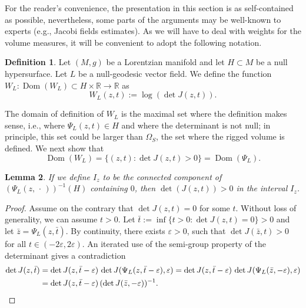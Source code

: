 \documentclass[12pt,a4paper]{amsart}
\theoremstyle{plain}
\newtheorem{lemma}{Lemma}[section]
\theoremstyle{definition}
\newtheorem{definition}[lemma]{Definition}
\numberwithin{equation}{section}
\let\temp\phi
\let\phi\varphi
\let\temp\epsilon
\let\epsilon\varepsilon
\let\varepsilon\temp
\newcommand{\R}{\mathbb{R}}
\DeclareMathOperator{\Dom}{Dom}
\DeclareMathOperator{\dom}{Dom}
\newcommand{\dotargument}{\,\cdot\,}
\newcommand{\gflow}{\Psi}
\begin{document}
For the reader's convenience, the presentation 
in this section is as self-contained as
possible, nevertheless, some parts of the arguments may be well-known
to experts (e.g., Jacobi fields estimates).
As we will have to deal with weights for the volume measures, it will be convenient  
to adopt the following notation. 
%
\begin{definition}
  Let $(M,g)$ be a Lorentzian manifold and let $H\subset M$ be a null hypersurface.
  Let $L$ be a null-geodesic vector field.
  We define the function $W_{L}: \Dom(W_{L}) \subset H\times \R\to \R$ as
%
\begin{equation}\label{E:W}
  W_{L}(z,t):=   \log(\det J(z,t))  .
\end{equation}
%
\end{definition}

The domain of definition of $W_{L}$ is the maximal set where the
definition makes sense, i.e., where $\gflow_{L}(z,t)\in H$ and where the
determinant is not null; in principle, this set could be larger than
$\Omega_S$, the set where the rigged volume is defined. 
%
We  next  show that
$$\dom(W_{L}) = \{ (z,t) \colon \det J(z,t) > 0 \}=\dom(\gflow_{L}).$$

\begin{lemma}\label{L:domainJ}
If we define
  $I_{z}$ to be the connected component of $(\gflow_{L}(z,\dotargument))^{-1} (H)$ containing $0$, then
$\det(J(z,t)) > 0$ in the interval $I_{z}$.
\end{lemma}

\begin{proof}
  Assume on the contrary that $\det J(z,t)=0$ for some $t$. Without
  loss of generality, we can assume $t>0$.
  Let $\bar t:=\inf\{t>0: \det J(z,t)=0\}>0$ and let $\bar
  z=\gflow_L(z,\bar t)$.
  By continuity, there exists $\epsilon>0$, such that $\det J(\bar z,t)>0$
  for all $t\in(-2\epsilon,2\epsilon)$.
  An iterated use of the semi-group property of the determinant gives
  a contradiction
  \begin{align*}
    \det J(z,\bar t)
    &=
      \det J(z,\bar t-\epsilon)
      \,
      \det J(\gflow_{L}(z,\bar t-\epsilon),\epsilon)
      =
      \det J(z,\bar t-\epsilon)
      \,
      \det J(\gflow_{L}(\bar z,-\epsilon),\epsilon)
    \\
    &
      =
      \det J(z,\bar t-\epsilon)
      \,
      (\det J(\bar z,-\epsilon))^{-1}
      .
      \qedhere
  \end{align*}
\end{proof}
\end{document}
